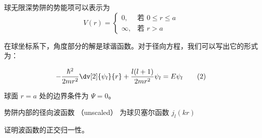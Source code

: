 
\begin{issues}
\issueDraft
\end{issues}


球无限深势阱的势能项可以表示为
$$
V(r)=
\begin{cases}
0,  & \text{若 $0\leq r\leq a$} \\
\infty, & \text{若 $r>a$}
\end{cases}\tag{1}
$$

在球坐标系下，角度部分的解是球谐函数。对于径向方程，我们可以写出它的形式为：

\begin{equation}
-\frac{\hbar^2}{2mr^2} \dv[2]{\psi_l}{r} + \frac{l(l + 1)}{2mr^2}\psi_l = E\psi_l\tag{2}
\end{equation}

球面 $r = a$ 处的边界条件为 $\Psi = 0$。

势阱内部的径向波函数 （unscaled） 为球贝塞尔函数 $j_l(kr)$

证明波函数的正交归一性。
